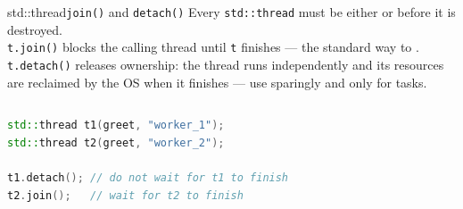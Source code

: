 \begin{frame}[fragile]{std::thread}{\texttt{join()} and \texttt{detach()}}
	\justifying
	Every \texttt{std::thread} must be either  or  before it is destroyed.\\
	\bigskip
	\texttt{t.join()} blocks the calling thread until \texttt{t} finishes — the standard way to .\\
	\bigskip
	\texttt{t.detach()} releases ownership: the thread runs independently and its resources are reclaimed by the OS when it finishes — use sparingly and only for  tasks.
	\begin{columns}
		\begin{lstlisting}[style=codebeamer, language=C++, caption=Joining threads.]
std::thread t1(greet, "worker_1");
std::thread t2(greet, "worker_2");

t1.detach(); // do not wait for t1 to finish
t2.join();   // wait for t2 to finish
    \end{lstlisting}
	\end{columns}
\end{frame}
